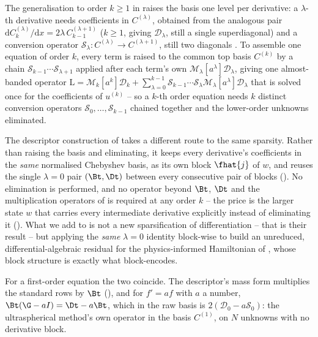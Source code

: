 The generalisation to order $k \ge 1$ in \cite{olver2013} raises the basis
one level per derivative: a $\lambda$-th derivative needs coefficients in
$C^{(\lambda)}$, obtained from the analogous pair
$\mathrm{d}C_k^{(\lambda)}/\mathrm{d}x = 2\lambda\,C_{k-1}^{(\lambda+1)}$
($k\ge1$, giving $\mathcal{D}_\lambda$, still a single superdiagonal) and a
conversion operator $\mathcal{S}_\lambda : C^{(\lambda)} \to C^{(\lambda+1)}$,
still two diagonals \cite[Eqs.~3.2--3.3]{olver2013}. To assemble one equation
of order $k$, every term is raised to the common top basis $C^{(k)}$ by a
chain $\mathcal{S}_{k-1}\cdots\mathcal{S}_{\lambda+1}$ applied after each
term's own $\mathcal{M}_\lambda[a^\lambda]\mathcal{D}_\lambda$, giving one
almost-banded operator $\mathrm{L} = \mathcal{M}_k[a^k]\mathcal{D}_k +
\sum_{\lambda=0}^{k-1}\mathcal{S}_{k-1}\cdots\mathcal{S}_\lambda
\mathcal{M}_\lambda[a^\lambda]\mathcal{D}_\lambda$ that is solved once for
the coefficients of $u^{(k)}$ \cite[\S3.2]{olver2013} -- so a $k$-th order
equation needs $k$ distinct conversion operators $\mathcal{S}_0, \dots,
\mathcal{S}_{k-1}$ chained together and the lower-order unknowns eliminated.

The descriptor construction of  takes a
different route to the same sparsity. Rather than raising the basis and
eliminating, it keeps every derivative's coefficients in the \emph{same}
normalised Chebyshev basis, as its own block $\fhat{j}$ of $w$, and reuses the
single $\lambda = 0$ pair $(\Bt, \Dt)$ between every consecutive
pair of blocks (). No elimination is
performed, and no operator beyond $\Bt$, $\Dt$ and the
multiplication operators of  is required at any
order $k$ -- the price is the larger state $w$ that carries every
intermediate derivative explicitly instead of eliminating it
(). What we add to \cite{olver2013}
is not a new sparsification of differentiation -- that is their result -- but
applying the \emph{same} $\lambda = 0$ identity block-wise to build an
unreduced, differential-algebraic residual for the physics-informed
Hamiltonian of \cite{wu2025pihm}, whose block structure is exactly what
 block-encodes.

For a first-order equation the two coincide. The descriptor's mass form multiplies the standard rows by $\Bt$ (), and for $f'=af$ with $a$ a number, $\Bt(\G-aI)=\Dt-a\Bt$, which in the raw basis is $2(\mathcal{D}_0-a\mathcal{S}_0)$: the ultraspherical method's own operator in the basis $C^{(1)}$, on $N$ unknowns with no derivative block.

